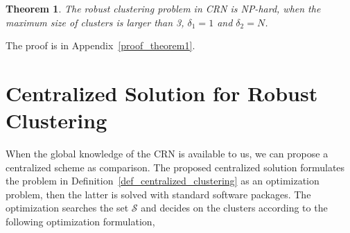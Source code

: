 \documentclass[10pt,journal,compsoc]{IEEEtran}
\theoremstyle{mytheoremstyle}
\newtheorem{theorem}{Theorem}[section]
\theoremstyle{mytheoremstyle}
\theoremstyle{mytheoremstyle}
\begin{document}
\begin{theorem}
\label{theorem1}
The robust clustering problem in CRN is NP-hard, when the maximum size of clusters is larger than 3, $\delta_1=1$ and $\delta_2 = N$.
\end{theorem}
The proof is in Appendix~\ref{proof_theorem1}.






\section{Centralized Solution for Robust Clustering}
\label{centralized_solution}
When the global knowledge of the CRN is available to us, we can propose a centralized scheme as comparison.
The proposed centralized solution formulates the problem in Definition~\ref{def_centralized_clustering} as an optimization problem, then the latter is solved with standard software packages.
The optimization searches the set $\mathcal{S}$ and decides on the clusters according to the following optimization formulation,
%
%
\end{document}
